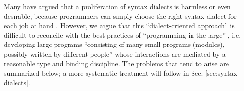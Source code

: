 
Many have argued that a proliferation of syntax dialects is harmless or even desirable, because programmers can simply choose the right syntax dialect for each job at hand \cite{journals/stp/Ward94}. However, we argue that this ``dialect-oriented approach'' is difficult to reconcile with the best practices of ``programming in the large''  \cite{DeRemer76}, i.e. developing large programs ``consisting of many small programs (modules), possibly written by different people'' whose interactions are mediated by a reasonable type and binding discipline. The problems that tend to arise are summarized below; a more systematic treatment will follow in  Sec. \ref{sec:syntax-dialects}.

